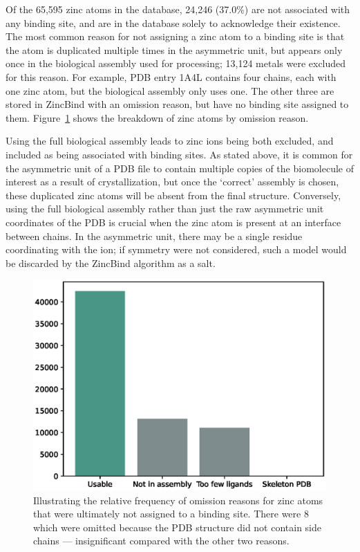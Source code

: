Of the 65,595 zinc atoms in the database, 24,246 (37.0\%) are not associated with any binding site, and are in the database solely to acknowledge their existence. The most common reason for not assigning a zinc atom to a binding site is that the atom is duplicated multiple times in the asymmetric unit, but appears only once in the biological assembly used for processing; 13,124 metals were excluded for this reason. For example, PDB entry 1A4L contains four chains, each with one zinc atom, but the biological assembly only uses one. The other three are stored in ZincBind with an omission reason, but have no binding site assigned to them. Figure~\ref{fig:omission} shows the breakdown of zinc atoms by omission reason.

Using the full biological assembly leads to zinc ions being both excluded, and included as being associated with binding sites. As stated above, it is common for the asymmetric unit of a PDB file to contain multiple copies of the biomolecule of interest as a result of crystallization, but once the `correct' assembly is chosen, these duplicated zinc atoms will be absent from the final structure. Conversely, using the full biological assembly rather than just the raw asymmetric unit coordinates of the PDB is crucial when the zinc atom is present at an interface between chains. In the asymmetric unit, there may be a single residue coordinating with the ion; if symmetry were not considered, such a model would be discarded by the ZincBind algorithm as a salt.

\begin{figure}
\centering
\includegraphics[width=1.0\textwidth]{Figures/omission.eps}
\caption[The relative frequency of omission reasons for zinc
atoms that were ultimately not assigned to a binding site.]{\label{fig:omission} Illustrating the relative frequency of omission reasons for zinc
atoms that were ultimately not assigned to a binding site. There were 8 which were omitted because
the PDB structure did not contain side chains --- insignificant compared with the other two reasons.}
\end{figure}

